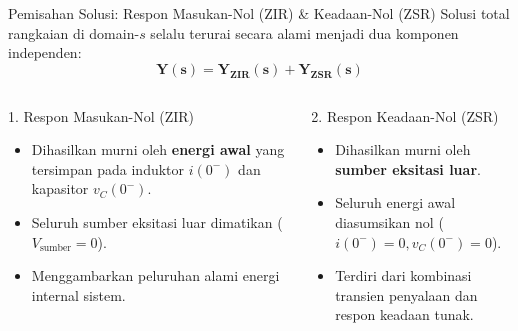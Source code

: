 \documentclass[aspectratio=169,10pt]{beamer}
\begin{document}
\begin{frame}{Pemisahan Solusi: Respon Masukan-Nol (ZIR) \& Keadaan-Nol (ZSR)}
  Solusi total rangkaian di domain-$s$ selalu terurai secara alami menjadi dua komponen independen:
  \begin{equation}
    \mathbf{Y(s) = Y_{\text{ZIR}}(s) + Y_{\text{ZSR}}(s)}
  \end{equation}
  \begin{columns}[t]
    \begin{block}{1. Respon Masukan-Nol (ZIR)}
      \begin{itemize}
        \item Dihasilkan murni oleh \textbf{energi awal} yang tersimpan pada induktor $i(0^-)$ dan kapasitor $v_C(0^-)$.
        \item Seluruh sumber eksitasi luar dimatikan ($V_{\text{sumber}} = 0$).
        \item Menggambarkan peluruhan alami energi internal sistem.
      \end{itemize}
    \end{block}

    \begin{exampleblock}{2. Respon Keadaan-Nol (ZSR)}
      \begin{itemize}
        \item Dihasilkan murni oleh \textbf{sumber eksitasi luar}.
        \item Seluruh energi awal diasumsikan nol ($i(0^-)=0, v_C(0^-)=0$).
        \item Terdiri dari kombinasi transien penyalaan dan respon keadaan tunak.
      \end{itemize}
    \end{exampleblock}
  \end{columns}
\end{frame}
\end{document}
